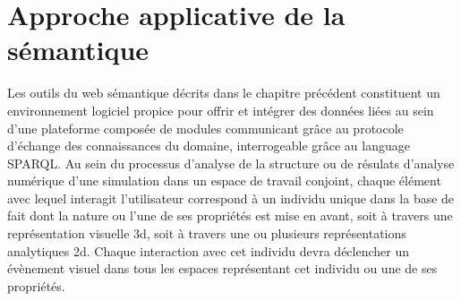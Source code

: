 \section{Approche applicative de la sémantique}




Les outils du web sémantique décrits dans le chapitre précédent constituent un environnement logiciel propice pour offrir et intégrer des données liées au sein d'une plateforme composée de modules communicant grâce au protocole d'échange des connaissances du domaine, interrogeable grâce au language SPARQL. %
Au sein du processus d'analyse de la structure ou de résulats d'analyse numérique d'une simulation dans un espace de travail conjoint, chaque élément avec lequel interagit l'utilisateur correspond à un individu unique dans la base de fait dont la nature ou l'une de ses propriétés est mise en avant, soit à travers une représentation visuelle 3d, soit à travers une ou plusieurs représentations analytiques 2d. Chaque interaction avec cet individu devra déclencher un évènement visuel dans tous les espaces représentant cet individu ou une de ses propriétés.

